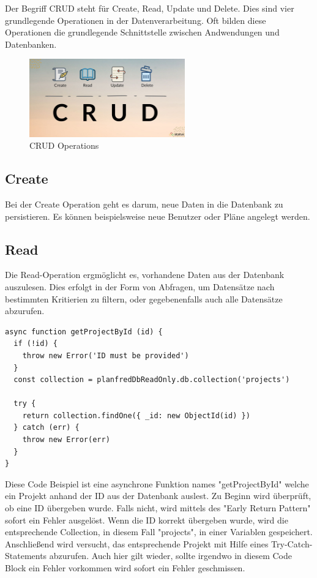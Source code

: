 Der Begriff CRUD steht für Create, Read, Update und Delete. Dies sind vier grundlegende Operationen in der Datenverarbeitung. Oft bilden diese Operationen die grundlegende Schnittstelle zwischen Andwendungen und Datenbanken.

\begin{figure}[h!]
    \centering
    \includegraphics[width=0.6\textwidth]{pics/CRUD.jpeg}
    \caption{CRUD Operations}
    \label{fig:enter-label}
\end{figure}


 \subsection{Create}

 Bei der Create Operation geht es darum, neue Daten in die Datenbank zu persistieren. Es können beispielsweise neue Benutzer oder Pläne angelegt werden.


 \subsection{Read}

 Die Read-Operation ergmöglicht es, vorhandene Daten aus der Datenbank auszulesen. Dies erfolgt in der Form von Abfragen, um Datensätze nach bestimmten Kritierien zu filtern, oder gegebenenfalls auch alle Datensätze abzurufen.

\begin{lstlisting}
async function getProjectById (id) {
  if (!id) {
    throw new Error('ID must be provided')
  }
  const collection = planfredDbReadOnly.db.collection('projects')

  try {
    return collection.findOne({ _id: new ObjectId(id) })
  } catch (err) {
    throw new Error(err)
  }
}
\end{lstlisting}

Diese Code Beispiel ist eine asynchrone Funktion names "getProjectById" welche ein Projekt anhand der ID aus der Datenbank auslest.\newline
Zu Beginn wird überprüft, ob eine ID übergeben wurde. Falls nicht, wird mittels des "Early Return Pattern" sofort ein Fehler ausgelöst. Wenn die ID korrekt übergeben wurde, wird die entsprechende Collection, in diesem Fall "projects", in einer Variablen gespeichert. Anschließend wird versucht, das entsprechende Projekt mit Hilfe eines Try-Catch-Statements abzurufen. Auch hier gilt wieder, sollte irgendwo in diesem Code Block ein Fehler vorkommen wird sofort ein Fehler geschmissen.



